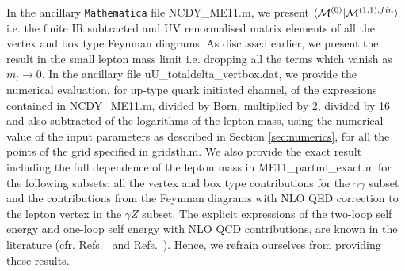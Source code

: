 \documentclass[11pt,a4paper]{article}
\begin{document}
In the ancillary {\tt Mathematica} file \textsf{NCDY\_ME11.m},
we present $\langle {\cal M}^{(0)} | {\cal M}^{(1,1),fin} \rangle$ i.e.
the finite IR subtracted and UV renormalised matrix elements of all the vertex
and box type Feynman diagrams.
As discussed earlier, we present the result in the small lepton mass limit
i.e. dropping all the terms which vanish as $m_l \rightarrow 0$.
%
In the ancillary file \textsf{uU\_totaldelta\_vertbox.dat},
we provide the numerical evaluation, for up-type quark initiated channel, of
the expressions contained in \textsf{NCDY\_ME11.m},
divided by Born, multiplied by 2, divided by 16 and also subtracted of the logarithms of the lepton mass,
using the numerical value of the input parameters as described in Section
\ref{sec:numerics},
for all the points of the grid specified in \textsf{gridsth.m}.
%
We also provide the exact result
including the full dependence of the lepton mass
in \textsf{ME11\_partml\_exact.m}
for the following subsets:
all the vertex and box type contributions for the $\gamma \gamma$ subset
and the contributions from the Feynman diagrams
with NLO QED correction to the lepton vertex in the $\gamma Z$ subset.
%
The explicit expressions
of the two-loop self energy and one-loop self energy with NLO QCD contributions,
are known in the literature (cfr. Refs.~\cite{Dittmaier:2020vra} and Refs.~\cite{Denner:1991kt}).
Hence, we refrain ourselves from providing these results.
\end{document}
